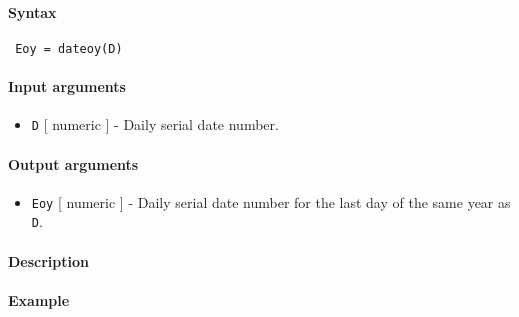 


	\paragraph{Syntax}
 
 \begin{verbatim}
 Eoy = dateoy(D)
 \end{verbatim}
 
 \paragraph{Input arguments}
 
 \begin{itemize}
 \item
   \texttt{D} {[} numeric {]} - Daily serial date number.
 \end{itemize}
 
 \paragraph{Output arguments}
 
 \begin{itemize}
 \item
   \texttt{Eoy} {[} numeric {]} - Daily serial date number for the last
   day of the same year as \texttt{D}.
 \end{itemize}
 
 \paragraph{Description}
 
 \paragraph{Example}


